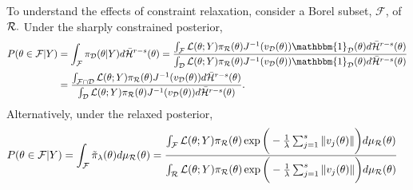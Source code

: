 \documentclass[10pt,fleqn]{article}
\DeclareMathOperator{\1}{\mathbbm{1}} \DeclareMathOperator{\bigO}{\mc O}
\begin{document}
To understand the effects of constraint relaxation, consider a Borel subset, $\mathcal{F}$, of $\mathcal{R}.$ Under the sharply constrained posterior,
\begin{equation}
\begin{aligned}
P(\theta\in\mc F|Y) &=\int_{\mc F} \pi_{\mc D}(\theta|Y) d\bar{\mc H}^{r-s}(\theta) =\frac{\int_{\mc F}  \mathcal{L}(\theta;Y)\pi_\mathcal{R}(\theta)J^{-1}(v_\mathcal{D}(\theta)) \mathbbm{1}_{\mc D}(\theta) d\bar{\mc H}^{r-s}(\theta)}{\int_{\mc D}  \mathcal{L}(\theta;Y)\pi_\mathcal{R}(\theta)J^{-1}(v_\mathcal{D}(\theta)) \mathbbm{1}_{\mc D}(\theta) d\bar{\mc H}^{r-s}(\theta)}\\
&=\frac{\int_{\mc F\cap \mc D}  \mathcal{L}(\theta;Y)\pi_\mathcal{R}(\theta)J^{-1}(v_\mathcal{D}(\theta)) d\bar{\mc H}^{r-s}(\theta)}{\int_{\mc D}  \mathcal{L}(\theta;Y)\pi_\mathcal{R}(\theta)J^{-1}(v_\mathcal{D}(\theta)) d\bar{\mc H}^{r-s}(\theta)}.
\end{aligned}
\end{equation}
Alternatively, under the relaxed posterior,
\begin{equation}
\begin{aligned}
P(\theta \in \mathcal{F} |Y) &= \int_{\mathcal{F}} \tilde{\pi}_\lambda(\theta) d\mu_{\mathcal{R}}(\theta) = \frac{\int_{\mathcal{F}} \mathcal{L}(\theta;Y)\pi_{\mathcal{R}}(\theta) \exp\bigg(-\frac{1}{\lambda}  \sum_{j=1}^s \| v_j(\theta)\|\bigg) d\mu_{\mathcal{R}}(\theta) }{\int_{\mathcal{R}} \mathcal{L}(\theta;Y)\pi_{\mathcal{R}}(\theta) \exp\bigg(-\frac{1}{\lambda}   \sum_{j=1}^s \| v_j(\theta)\|\bigg) d\mu_{\mathcal{R}}(\theta)}
\end{aligned}
\label{EQ:measure_zero_relax}
\end{equation}
\end{document}
